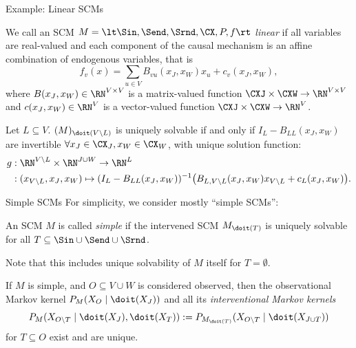 \begin{frame}{Example: Linear SCMs}
  \begin{Def}
We call an SCM $M=\lt \Sin, \Send, \Srnd, \CX, P, f \rt$
\emph{linear} if all variables are real-valued and
each component of the causal mechanism is an affine combination of endogenous variables, that is
$$
    f_v(x) = \sum_{u\in V} B_{vu}(x_J,x_W) x_u + c_v(x_J,x_W),
$$
    where $B(x_J,x_W)\in\RN^{V \times V}$ is a matrix-valued function $\CXJ\times\CXW \to \RN^{V\times V}$ and
$c(x_J,x_W) \in \RN^V$ is a vector-valued function $\CXJ\times\CXW \to \RN^V$.
  \end{Def}

  \begin{Prp}
Let $L \subseteq V$.
$(M)_{\doit(V\setminus L)}$ is uniquely solvable if and only if 
$I_{L}-B_{LL}(x_J,x_W)$ are invertible $\forall x_J \in \CX_J, x_W \in \CX_W$,
with unique solution function:
\small
  \begin{equation*}\begin{split}
    g &: \RN^{V\setminus L} \times \RN^{J\cup W} \to \RN^L \\
      &: (x_{V\setminus L},x_J,x_W) \mapsto (I_L - B_{LL}(x_J,x_W))^{-1} \big(B_{L,{V\setminus L}}(x_J,x_W) x_{V\setminus L} + c_{L}(x_J,x_W)\big).
  \end{split}\end{equation*}
  \end{Prp}
\end{frame}

\begin{frame}{Simple SCMs}
For simplicity, we consider mostly ``simple SCMs'':
\begin{definition}
  An SCM $M$ is called \emph{simple} if the intervened SCM
  $M_{\doit(T)}$ is uniquely solvable for all $T \subseteq \Sin \cup \Send \cup \Srnd$. 
\end{definition}
Note that this includes unique solvability of $M$ itself for $T = \emptyset$.
\begin{corollary}
  If $M$ is simple, and $O \subseteq V \cup W$ is considered observed, then the
  observational Markov kernel $P_{M}(X_O \mid \doit(X_J))$
  and all its \emph{interventional Markov kernels}
  $$P_{M}(X_{O\setminus T} \mid \doit(X_J),\doit(X_T)) := P_{M_{\doit(T)}}(X_{O\setminus T} \mid \doit(X_{J \cup T}))$$
  for $T \subseteq O$ exist and are unique.
\end{corollary}
\end{frame}

